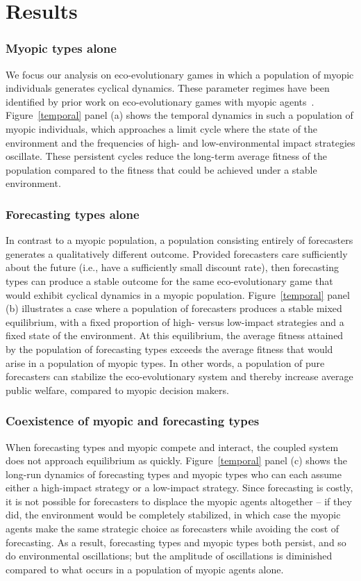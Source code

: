 \documentclass{article}
\begin{document}
\section*{Results}

\subsubsection*{Myopic types alone}
We focus our analysis on eco-evolutionary games in which a population of myopic individuals generates cyclical dynamics. These parameter regimes have been identified by prior work on eco-evolutionary games with myopic agents~\citep{tilman2020}. Figure~\ref{temporal} panel (a) shows the temporal dynamics in such a population of myopic individuals, which approaches a limit cycle where the state of the environment and the frequencies of high- and low-environmental impact strategies oscillate. These persistent cycles reduce the long-term average fitness of the population compared to the fitness that could be achieved under a stable environment.

\subsubsection*{Forecasting types alone}
In contrast to a myopic population, a population consisting entirely of forecasters generates a qualitatively different outcome. Provided forecasters care sufficiently about the future (i.e., have a sufficiently small discount rate), then forecasting types can produce a stable outcome for the same eco-evolutionary game that would exhibit cyclical dynamics in a myopic population. Figure~\ref{temporal} panel (b) illustrates a case where a population of forecasters produces a stable mixed equilibrium, with a fixed proportion of high- versus low-impact strategies and a fixed state of the environment. At this equilibrium, the average fitness attained by the population of forecasting types exceeds the average fitness that would arise in a population of myopic types. In other words, a population of pure forecasters can stabilize the eco-evolutionary system and thereby increase average public welfare, compared to myopic decision makers.


\subsubsection*{Coexistence of myopic and forecasting types}
When forecasting types and myopic compete and interact, the coupled system does not approach equilibrium as quickly. Figure~\ref{temporal} panel (c) shows the long-run dynamics of forecasting types and myopic types who can each assume either a high-impact strategy or a low-impact strategy. Since forecasting is costly, it is not possible for forecasters to displace the myopic agents altogether --  if they did, the environment would be completely stabilized, in which case the myopic agents make the same strategic choice as forecasters while avoiding the cost of forecasting. As a result, forecasting types and myopic types both persist, and so do environmental oscillations; but the amplitude of oscillations is diminished compared to what occurs in a population of myopic agents alone.
\end{document}
